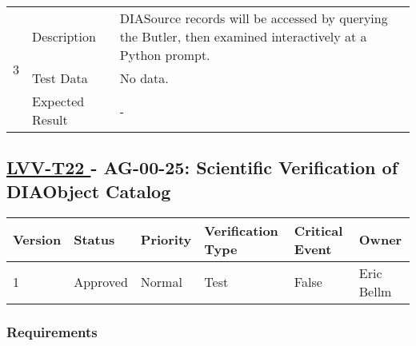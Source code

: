 \begin{longtable}[]{p{1.3cm}p{2cm}p{13cm}}
\multirow{3}{*}{ 3 } & Description &
\begin{minipage}[t]{13cm}{\footnotesize
DIASource records will be accessed by querying the Butler, then examined
interactively at a Python prompt.
 
\vspace{\dp0}
} \end{minipage} \\ \cline{2-3}
& Test Data & 
\begin{minipage}[t]{13cm}{\footnotesize

No data. 
\vspace{\dp0}

} \end{minipage} \\ \cline{2-3}
& Expected Result &

\begin{minipage}[t]{13cm}{\footnotesize
-
\vspace{\dp0}
} \end{minipage} 


\\ \midrule

\end{longtable}




\subsection{ \href{https://jira.lsstcorp.org/secure/Tests.jspa\#/testCase/LVV-T22}{ LVV-T22 }
             - AG-00-25: Scientific Verification of DIAObject Catalog }\label{lvv-t22}





\begin{longtable}[]{llllll}
\toprule
Version & Status & Priority & Verification Type & Critical Event & Owner
\\\midrule
1 & Approved & Normal & Test & False & Eric Bellm
\\\bottomrule
\end{longtable}

\subsubsection{Requirements}

